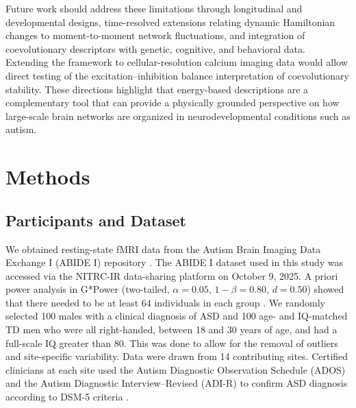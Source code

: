 \documentclass[10pt,letterpaper]{article}
\begin{document}
Future work should address these limitations through longitudinal and developmental designs,
time-resolved extensions relating dynamic Hamiltonian changes to moment-to-moment network
fluctuations, and integration of coevolutionary descriptors with genetic, cognitive, and behavioral
data. Extending the framework to cellular-resolution calcium imaging data would allow direct
testing of the excitation--inhibition balance interpretation of coevolutionary stability. These
directions highlight that energy-based descriptions are a complementary tool that can provide a
physically grounded perspective on how large-scale brain networks are organized in neurodevelopmental
conditions such as autism.

\section*{Methods}

\subsection*{Participants and Dataset}
We obtained resting-state fMRI data from the Autism Brain Imaging Data Exchange I (ABIDE I)
repository \cite{DiMartino:2014abide}. The ABIDE I dataset used in this study was accessed via the NITRC-IR 
data-sharing platform on October 9, 2025. A priori power analysis in G*Power (two-tailed, $\alpha=0.05$,
$1-\beta=0.80$, $d=0.50$) showed that there needed to be at least 64 individuals in each group
\cite{Faul2009}. We randomly selected 100 males with a clinical diagnosis of ASD and 100 age- and
IQ-matched TD men who were all right-handed, between 18 and 30 years of age, and had a full-scale
IQ greater than 80. This was done to allow for the removal of outliers and site-specific variability.
Data were drawn from 14 contributing sites. Certified clinicians at each site used the Autism
Diagnostic Observation Schedule (ADOS) and the Autism Diagnostic Interview--Revised (ADI-R) to
confirm ASD diagnosis according to DSM-5 criteria \cite{APA:2022ds}.
\end{document}
